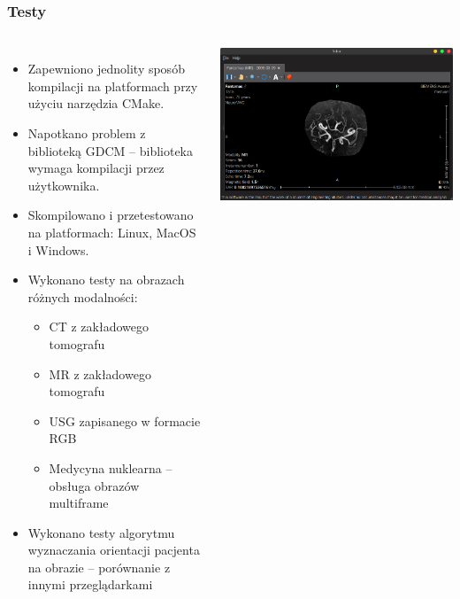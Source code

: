 \documentclass[aspectratio=169]{beamer}
\begin{document}
\begin{frame}[t]
    \frametitle{Testy}

    \vspace{-3mm}
    \begin{columns}[T]

        \begin{itemize}
            \item Zapewniono jednolity sposób kompilacji na platformach przy użyciu narzędzia CMake.
            \item Napotkano problem z biblioteką GDCM -- biblioteka wymaga kompilacji przez użytkownika.
            \item Skompilowano i przetestowano na platformach: Linux, MacOS i Windows.
            \item Wykonano testy na obrazach różnych modalności:
                  \begin{itemize}
                      \item CT z zakładowego tomografu
                      \item MR z zakładowego tomografu
                      \item USG zapisanego w formacie RGB
                      \item Medycyna nuklearna -- obsługa obrazów multiframe
                  \end{itemize}
            \item Wykonano testy algorytmu wyznaczania orientacji pacjenta na obrazie -- porównanie z innymi przeglądarkami
        \end{itemize}
        \includegraphics[width=\textwidth]{img/test001.png}

\end{columns}
\end{frame}
\end{document}
